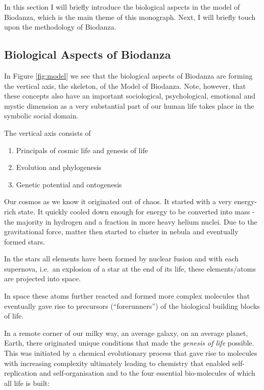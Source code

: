 \documentclass[
  11pt,
]{book}
\providecommand{\tightlist}{%
  \setlength{\itemsep}{0pt}\setlength{\parskip}{0pt}}
\begin{document}
In this section I will briefly introduce the biological aspects in the model of Biodanza, which is the main theme of this monograph. Next, I will briefly touch upon the methodology of Biodanza.

\hypertarget{biological-aspects-of-biodanza}{%
\subsection{Biological Aspects of Biodanza}\label{biological-aspects-of-biodanza}}

In Figure \ref{fig:model} we see that the biological aspects of Biodanza are forming the vertical axis, the skeleton, of the Model of Biodanza. Note, however, that these concepts also have an important sociological, psychological, emotional and mystic dimension as a very substantial part of our human life takes place in the symbolic social domain.

The vertical axis consists of

\begin{enumerate}
\def\labelenumi{\arabic{enumi}.}
\tightlist
\item
  Principals of cosmic life and genesis of life
\item
  Evolution and phylogenesis
\item
  Genetic potential and ontogenesis
\end{enumerate}

Our cosmos as we know it originated out of chaos. It started with a very energy-rich state. It quickly cooled down enough for energy to be converted into mass - the majority in hydrogen and a fraction in more heavy helium nuclei. Due to the gravitational force, matter then started to cluster in nebula and eventually formed stars.

In the stars all elements have been formed by nuclear fusion and with each supernova, i.e.~an explosion of a star at the end of its life, these elements/atoms are projected into space.

In space these atoms further reacted and formed more complex molecules that eventually gave rise to precursors (``forerunners'') of the biological building blocks of life.

In a remote corner of our milky way, an average galaxy, on an average planet, Earth, there originated unique conditions that made the \emph{genesis of life} possible.
This was initiated by a chemical evolutionary process that gave rise to molecules with increasing complexity ultimately leading to chemistry that enabled self-replication and self-organisation and to the four essential bio-molecules of which all life is built:
\end{document}
